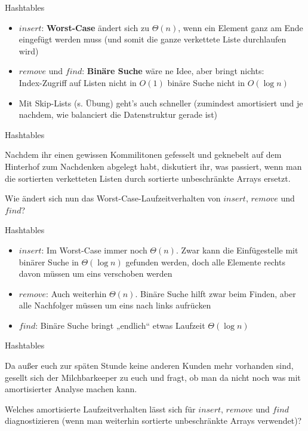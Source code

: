 \begin{frame}{Hashtables}
	\solutionheading
	
	\begin{itemize}
		\item $insert$: \textbf{Worst-Case} ändert sich zu $\Theta(n)$, wenn ein Element ganz am Ende eingefügt werden muss (und somit die ganze verkettete Liste durchlaufen wird)
		\item $remove$ und $find$: \textbf{Binäre Suche} wäre ne Idee, aber bringt nichts: \\
		Index-Zugriff auf Listen nicht in $O(1)$ \impl binäre Suche nicht in $O(\log n)$ \\
		\pause 
		\item {\small Mit Skip-Lists (s. Übung) geht's auch schneller (zumindest amortisiert und je nachdem, wie balanciert die Datenstruktur gerade ist)}
	\end{itemize}
\end{frame}


\begin{frame}{Hashtables}
	
	Nachdem ihr einen gewissen Kommilitonen gefesselt und geknebelt auf dem Hinterhof zum Nachdenken abgelegt habt, diskutiert ihr, was passiert, wenn man die sortierten verketteten Listen durch sortierte unbeschränkte Arrays ersetzt.
	\medskip
	
	Wie ändert sich nun das Worst-Case-Laufzeitverhalten von $insert$, $remove$ und $find$?
\end{frame}

\begin{frame}{Hashtables}
	\solutionheading
	\begin{itemize}
		\item $insert$: Im Worst-Case immer noch $\Theta(n)$. Zwar kann die Einfügestelle mit binärer Suche in $\Theta( \log n)$ gefunden werden, doch alle Elemente rechts davon müssen um eins verschoben werden
		\pause
		\item $remove$: Auch weiterhin $\Theta(n)$. Binäre Suche hilft zwar beim Finden, aber alle Nachfolger müssen um eins nach links aufrücken
		\pause
		\item $find$: Binäre Suche bringt „endlich“ etwas \impl Laufzeit $\Theta( \log n)$
	\end{itemize}
\end{frame}


\begin{frame}{Hashtables}
	
	Da außer euch zur späten Stunde keine anderen Kunden mehr vorhanden sind, gesellt sich der Milchbarkeeper zu euch und fragt, ob man da nicht noch was mit amortisierter Analyse machen kann.
	\medskip
	
	Welches amortisierte Laufzeitverhalten lässt sich für $insert$, $remove$ und $find$ diagnostizieren (wenn man weiterhin sortierte unbeschränkte Arrays verwendet)?
\end{frame}

